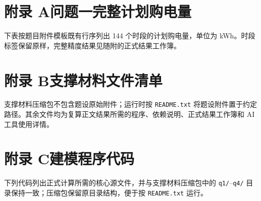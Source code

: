 \clearpage
\section*{附录 A\quad 问题一完整计划购电量}
下表按题目附件模板既有行序列出 144 个时段的计划购电量，单位为 kWh。时段标签保留原样，完整精度结果见随附的正式结果工作簿。


\clearpage
\section*{附录 B\quad 支撑材料文件清单}
支撑材料压缩包不包含题设原始附件；运行时按 \texttt{README.txt} 将题设附件置于约定路径。其余文件均为复算正文结果所需的程序、依赖说明、正式结果工作簿和 AI 工具使用详情。


\clearpage
\section*{附录 C\quad 建模程序代码}
下列代码列出正式计算所需的核心源文件，并与支撑材料压缩包中的 \texttt{q1/}--\texttt{q4/} 目录保持一致；压缩包保留原目录结构，便于按 \texttt{README.txt} 运行。

